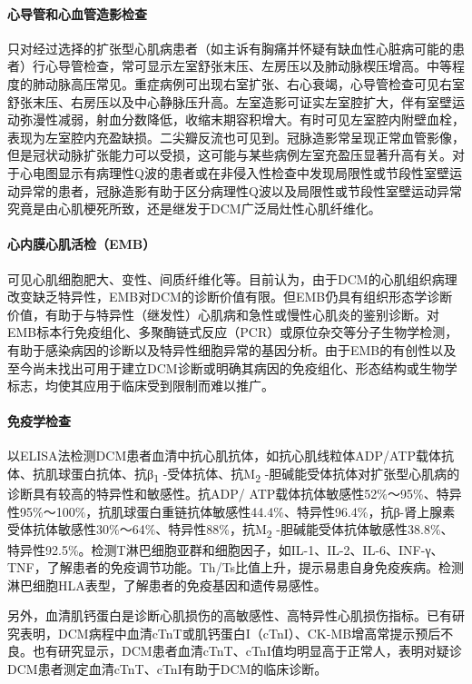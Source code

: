 \paragraph{心导管和心血管造影检查}

只对经过选择的扩张型心肌病患者（如主诉有胸痛并怀疑有缺血性心脏病可能的患者）行心导管检查，常可显示左室舒张末压、左房压以及肺动脉楔压增高。中等程度的肺动脉高压常见。重症病例可出现右室扩张、右心衰竭，心导管检查可见右室舒张末压、右房压以及中心静脉压升高。左室造影可证实左室腔扩大，伴有室壁运动弥漫性减弱，射血分数降低，收缩末期容积增大。有时可见左室腔内附壁血栓，表现为左室腔内充盈缺损。二尖瓣反流也可见到。冠脉造影常呈现正常血管影像，但是冠状动脉扩张能力可以受损，这可能与某些病例左室充盈压显著升高有关。对于心电图显示有病理性Q波的患者或在非侵入性检查中发现局限性或节段性室壁运动异常的患者，冠脉造影有助于区分病理性Q波以及局限性或节段性室壁运动异常究竟是由心肌梗死所致，还是继发于DCM广泛局灶性心肌纤维化。

\paragraph{心内膜心肌活检（EMB）}

可见心肌细胞肥大、变性、间质纤维化等。目前认为，由于DCM的心肌组织病理改变缺乏特异性，EMB对DCM的诊断价值有限。但EMB仍具有组织形态学诊断价值，有助于与特异性（继发性）心肌病和急性或慢性心肌炎的鉴别诊断。对EMB标本行免疫组化、多聚酶链式反应（PCR）或原位杂交等分子生物学检测，有助于感染病因的诊断以及特异性细胞异常的基因分析。由于EMB的有创性以及至今尚未找出可用于建立DCM诊断或明确其病因的免疫组化、形态结构或生物学标志，均使其应用于临床受到限制而难以推广。

\paragraph{免疫学检查}

以ELISA法检测DCM患者血清中抗心肌抗体，如抗心肌线粒体ADP/ATP载体抗体、抗肌球蛋白抗体、抗β\textsubscript{1}
-受体抗体、抗M\textsubscript{2}
-胆碱能受体抗体对扩张型心肌病的诊断具有较高的特异性和敏感性。抗ADP/
ATP载体抗体敏感性52\%～95\%、特异性95\%～100\%，抗肌球蛋白重链抗体敏感性44.4\%、特异性96.4\%，抗β-肾上腺素受体抗体敏感性30\%～64\%、特异性88\%，抗M\textsubscript{2}
-胆碱能受体抗体敏感性38.8\%、特异性92.5\%。检测T淋巴细胞亚群和细胞因子，如IL-1、IL-2、IL-6、INF-γ、TNF，了解患者的免疫调节功能。Th/Ts比值上升，提示易患自身免疫疾病。检测淋巴细胞HLA表型，了解患者的免疫基因和遗传易感性。

另外，血清肌钙蛋白是诊断心肌损伤的高敏感性、高特异性心肌损伤指标。已有研究表明，DCM病程中血清cTnT或肌钙蛋白I（cTnI）、CK-MB增高常提示预后不良。也有研究显示，DCM患者血清cTnT、cTnI值均明显高于正常人，表明对疑诊DCM患者测定血清cTnT、cTnI有助于DCM的临床诊断。

